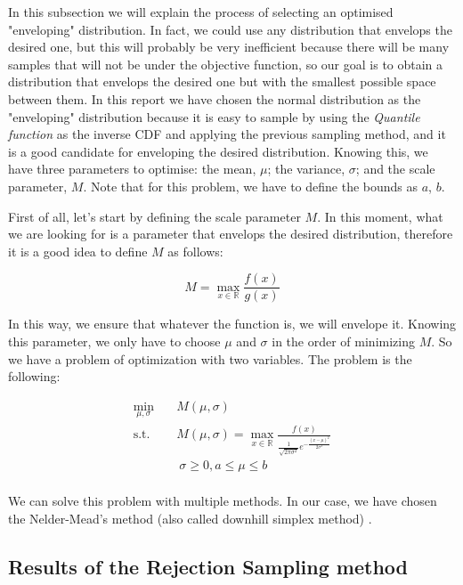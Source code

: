 \documentclass{report}
\begin{document}
In this subsection we will explain the process of selecting an optimised "enveloping" distribution. In fact, we could use any distribution that envelops the desired one, but this will probably be very inefficient because there will be many samples that will not be under the objective function, so our goal is to obtain a distribution that envelops the desired one but with the smallest possible space between them. In this report we have chosen the normal distribution as the "enveloping" distribution because it is easy to sample by using the \textit{Quantile function} as the inverse CDF and applying the previous sampling method, and it is a good candidate for enveloping the desired distribution. Knowing this, we have three parameters to optimise: the mean, \(\mu\); the variance, \(\sigma\); and the scale parameter, \(M\). Note that for this problem, we have to define the bounds as \(a\), \(b\).

First of all, let's start by defining the scale parameter \(M\). In this moment, what we are looking for is a parameter that envelops the desired distribution, therefore it is a good idea to define \(M\) as follows:

\begin{equation}
	M = \max_{x \in \mathbb{R}} \frac{f(x)}{g(x)}
\end{equation}

In this way, we ensure that whatever the function is, we will envelope it. Knowing this parameter, we only have to choose \(\mu\) and \(\sigma\) in the order of minimizing \(M\). So we have a problem of optimization with two variables. The problem is the following:

\begin{equation}
	\begin{aligned}
		\min_{\mu, \sigma} \quad & M(\mu,\sigma) \\
		\textrm{s.t.} \quad & M(\mu,\sigma) = \max_{x \in \mathbb{R}} \frac{f(x)}{\frac{1}{\sqrt{2\pi\sigma^2}}e^{-\frac{(x-\mu)^2}{2\sigma^2}}} \\
		\quad &\ \sigma \geq 0, a \leq \mu \leq b \\
	\end{aligned}
	\label{eq:problemmaxmin}
\end{equation}

We can solve this problem with multiple methods. In our case, we have chosen the Nelder-Mead's method (also called downhill simplex method) \cite{doi:10.1137/S1052623496303482}.

\subsection{Results of the Rejection Sampling method}
\label{sec:results_rejection_sampling}
\end{document}
